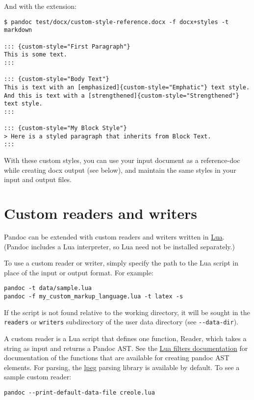 \documentclass[
]{article}
\begin{document}
And with the extension:

\begin{verbatim}
$ pandoc test/docx/custom-style-reference.docx -f docx+styles -t markdown

::: {custom-style="First Paragraph"}
This is some text.
:::

::: {custom-style="Body Text"}
This is text with an [emphasized]{custom-style="Emphatic"} text style.
And this is text with a [strengthened]{custom-style="Strengthened"}
text style.
:::

::: {custom-style="My Block Style"}
> Here is a styled paragraph that inherits from Block Text.
:::
\end{verbatim}

With these custom styles, you can use your input document as a
reference-doc while creating docx output (see below), and maintain the
same styles in your input and output files.

\section{Custom readers and writers}\label{custom-readers-and-writers}

Pandoc can be extended with custom readers and writers written in
\href{https://www.lua.org}{Lua}. (Pandoc includes a Lua interpreter, so
Lua need not be installed separately.)

To use a custom reader or writer, simply specify the path to the Lua
script in place of the input or output format. For example:

\begin{verbatim}
pandoc -t data/sample.lua
pandoc -f my_custom_markup_language.lua -t latex -s
\end{verbatim}

If the script is not found relative to the working directory, it will be
sought in the \texttt{readers} or \texttt{writers} subdirectory of the
user data directory (see \texttt{-\/-data-dir}).

A custom reader is a Lua script that defines one function, Reader, which
takes a string as input and returns a Pandoc AST. See the
\href{https://pandoc.org/lua-filters.html}{Lua filters documentation}
for documentation of the functions that are available for creating
pandoc AST elements. For parsing, the
\href{http://www.inf.puc-rio.br/~roberto/lpeg/}{lpeg} parsing library is
available by default. To see a sample custom reader:

\begin{verbatim}
pandoc --print-default-data-file creole.lua
\end{verbatim}
\end{document}
